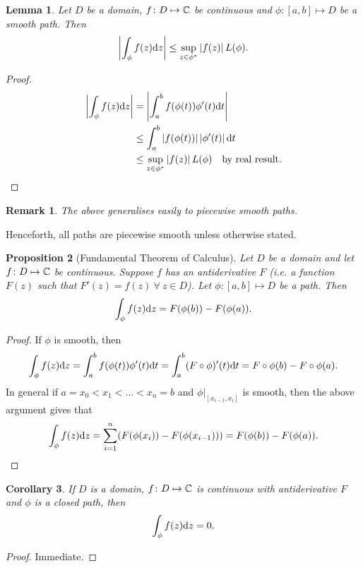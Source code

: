 \documentclass{notes}
\theoremstyle{plain}
\newtheorem{proposition}{Proposition}[chapter]
\newtheorem{corollary}[proposition]{Corollary}
\newtheorem{lemma}[proposition]{Lemma}
\newtheorem*{remark}{Remark}
\begin{document}
\begin{lemma}
Let $D$ be a domain, $f \colon D \mapsto \mathbb{C}$ be continuous and $\phi \colon [a,b]
\mapsto D$ be a smooth path.  Then
\[
\left|\int_\phi f(z) \mathrm{d} z\right| \le \sup_{z \in \phi^*} \left|f(z)\right| L(\phi).
\]
\end{lemma}

\begin{proof}
\begin{align*}
\left|\int_\phi f(z) \mathrm{d} z\right| &= \left|\int_a^b f(\phi(t)) \phi'(t) \mathrm{d} t\right| \\
&\le \int_a^b \left|f(\phi(t))\right| \left|\phi'(t)\right| \mathrm{d} t \\
&\le \sup_{z \in \phi^*} \left|f(z)\right| L(\phi) \quad \text{by real result}.
\end{align*}
\end{proof}

\begin{remark}
The above generalises easily to piecewise smooth paths.
\end{remark}

Henceforth, all paths are piecewise smooth unless otherwise stated.

\begin{proposition}[Fundamental Theorem of Calculus]%
Let $D$ be a domain and let $f \colon D \mapsto \mathbb{C}$ be continuous.  Suppose
$f$ has an antiderivative $F$ (i.e. a function $F(z)$ such that
$F'(z) = f(z)\ \forall\ z \in D$).  Let $\phi \colon [a,b] \mapsto D$ be a
path.  Then
\[
\int_{\phi} f(z) \mathrm{d} z = F(\phi(b)) - F(\phi(a)).
\]
\end{proposition}

\begin{proof}
If $\phi$ is smooth, then
\[
\int_\phi f(z) \mathrm{d} z = \int_a^b f(\phi(t))\phi'(t) \mathrm{d} t = \int_a^b
(F \circ \phi)'(t) \mathrm{d} t = F \circ \phi (b) - F \circ \phi(a).
\]
In general if $a = x_0 < x_1 < \dots < x_n = b$ and $\phi \bigr|_{[x_{i-1},
x_i]}$ is smooth, then the above argument gives that
\[
\int_\phi f(z) \mathrm{d} z = \sum_{i=1}^n (F(\phi(x_i)) - F(\phi(x_{i-1}))) =
F(\phi(b)) - F(\phi(a)).
\]
\end{proof}

\begin{corollary}
If $D$ is a domain, $f \colon D \mapsto \mathbb{C}$ is continuous with antiderivative
$F$ and $\phi$ is a closed path, then
\[
\int_\phi f(z) \mathrm{d} z = 0.
\]
\end{corollary}

\begin{proof}
Immediate.
\end{proof}
\end{document}
